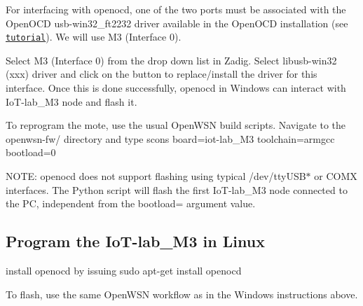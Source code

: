 \begin{DoxyEnumerate}
\item For interfacing with openocd, one of the two ports must be associated with the Open\+O\+CD {\ttfamily usb-\/win32\+\_\+ft2232} driver available in the Open\+O\+CD installation (see \href{https://github.com/hikob/openlab/wiki/Installation-Notes-for-Windows-Users}{\tt tutorial}). We will use {\ttfamily M3 (Interface 0)}.
\end{DoxyEnumerate}
\begin{DoxyEnumerate}
\item Select {\ttfamily M3 (Interface 0)} from the drop down list in Zadig. Select {\ttfamily libusb-\/win32 (xxx)} driver and click on the button to replace/install the driver for this interface. Once this is done successfully, openocd in Windows can interact with Io\+T-\/lab\+\_\+\+M3 node and flash it.
\end{DoxyEnumerate}
\begin{DoxyEnumerate}
\item To reprogram the mote, use the usual Open\+W\+SN build scripts. Navigate to the {\ttfamily openwsn-\/fw/} directory and type {\ttfamily scons board=iot-\/lab\+\_\+\+M3 toolchain=armgcc bootload=0}
\end{DoxyEnumerate}

N\+O\+TE\+: openocd does not support flashing using typical {\ttfamily /dev/tty\+U\+S\+B$\ast$} or {\ttfamily C\+O\+MX} interfaces. The Python script will flash the first Io\+T-\/lab\+\_\+\+M3 node connected to the PC, independent from the {\ttfamily bootload=} argument value.

\subsection*{Program the Io\+T-\/lab\+\_\+\+M3 in Linux }


\begin{DoxyEnumerate}
\item install openocd by issuing \textquotesingle{}sudo apt-\/get install openocd\textquotesingle{}
\item To flash, use the same Open\+W\+SN workflow as in the Windows instructions above. 
\end{DoxyEnumerate}